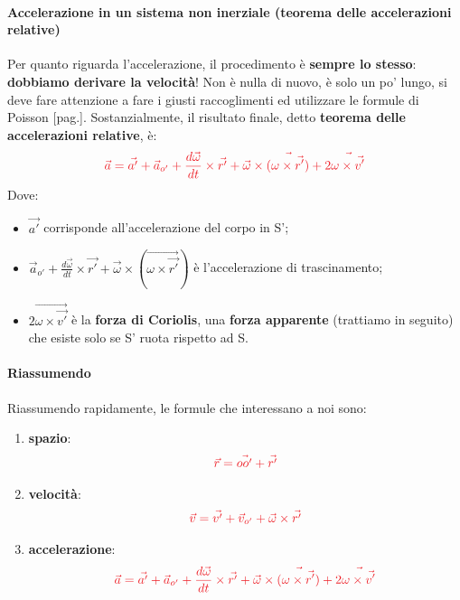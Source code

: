             \paragraph{Accelerazione in un sistema non inerziale (teorema delle accelerazioni relative)}
                Per quanto riguarda l'accelerazione, il procedimento è \textbf{sempre lo stesso}: \textbf{dobbiamo derivare la velocità}! Non è nulla di nuovo, è solo un po' lungo, si deve fare attenzione a fare i giusti raccoglimenti ed utilizzare le formule di Poisson [pag.\pageref{Poisson}]. Sostanzialmente, il risultato finale, detto \textbf{teorema delle accelerazioni relative}, è:
                \begin{align*}
                    \textcolor{Red}{\vec{a} = \vec{a'} + \vec{a}_{o'}+\frac{d\vec{\omega}}{dt}\times \vec{r'}+\vec{\omega}\times(\vec{\omega\times\vec{r'}})+2\vec{\omega\times\vec{v'}}}
                \end{align*}
                Dove:
                \begin{itemize}
                    \item $\vec{a'}$ corrisponde all'accelerazione del corpo in S';
                    \item $\vec{a}_{o'}+\frac{d\vec{\omega}}{dt}\times \vec{r'}+\vec{\omega}\times(\vec{\omega\times\vec{r'}})$ è l'accelerazione di trascinamento;
                    \item $2\vec{\omega\times\vec{v'}}$ è la \textbf{forza di Coriolis}, una \textbf{forza apparente} (trattiamo in seguito) che esiste solo se S' ruota rispetto ad S.
                \end{itemize}


            \paragraph{Riassumendo}
                Riassumendo rapidamente, le formule che interessano a noi sono:
                \begin{enumerate}
                    \item \textbf{spazio}:
                        \begin{align*}
                            \textcolor{Red}{\vec{r}=\vec{oo'}+\vec{r'}}
                        \end{align*}
                    \item \textbf{velocità}:
                        \begin{align*}
                            \textcolor{Red}{\vec{v}=\vec{v'} + \vec{v}_{o'} + \vec{\omega}\times\vec{r'}}
                        \end{align*}
                    \item \textbf{accelerazione}:
                        \begin{align*}
                            \textcolor{Red}{\vec{a} = \vec{a'} + \vec{a}_{o'}+\frac{d\vec{\omega}}{dt}\times \vec{r'}+\vec{\omega}\times(\vec{\omega\times\vec{r'}})+2\vec{\omega\times\vec{v'}}}
                        \end{align*}
                \end{enumerate}

